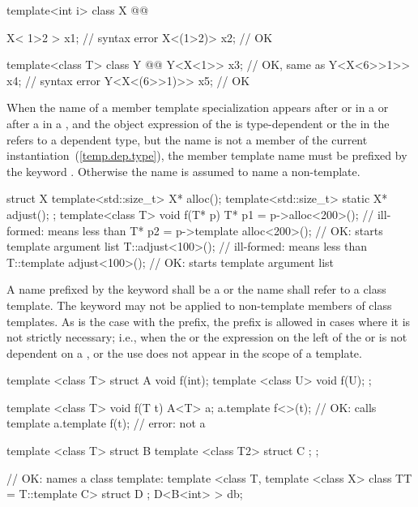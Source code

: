 \begin{codeblock}
template<int i> class X @@

X< 1>2 > x1;                        // syntax error
X<(1>2)> x2;                        // OK

template<class T> class Y @@
Y<X<1>> x3;                         // OK, same as 
Y<X<6>>1>> x4;                      // syntax error
Y<X<(6>>1)>> x5;                    // OK
\end{codeblock}
\exitexample

\pnum
When the name of a member template specialization appears after
or
\tcode{->}
in a
or after a
in a
,
and the
object expression of the
is type-dependent
or
the  in the
refers to a dependent type, but the name is not
a member of the current instantiation~(\ref{temp.dep.type}),
the member template name must be prefixed by the keyword
.
Otherwise the name is assumed to name a non-template.
\enterexample

\begin{codeblock}
struct X {
  template<std::size_t> X* alloc();
  template<std::size_t> static X* adjust();
};
template<class T> void f(T* p) {
  T* p1 = p->alloc<200>();          // ill-formed: \tcode{<} means less than
  T* p2 = p->template alloc<200>(); // OK: \tcode{<} starts template argument list
  T::adjust<100>();                 // ill-formed: \tcode{<} means less than
  T::template adjust<100>();        // OK: \tcode{<} starts template argument list
}
\end{codeblock}
\exitexample

\pnum
A name prefixed by the keyword
shall be a  or the name shall refer to a class template.
\enternote
The keyword
may not be applied to non-template members of class templates.
\exitnote
\enternote
As is the case with the
prefix, the
prefix is allowed in cases where it is not strictly
necessary; i.e., when the  or
the expression on the left of
the
\tcode{->}
or
is not dependent on a
, or the use does not appear in the
scope of a template.
\exitnote
\enterexample
\begin{codeblock}
template <class T> struct A {
  void f(int);
  template <class U> void f(U);
};

template <class T> void f(T t) {
  A<T> a;
  a.template f<>(t);                // OK: calls template
  a.template f(t);                  // error: not a 
}

template <class T> struct B {
  template <class T2> struct C { };
};

// OK:  names a class template:
template <class T, template <class X> class TT = T::template C> struct D { };
D<B<int> > db;
\end{codeblock}
\exitexample

